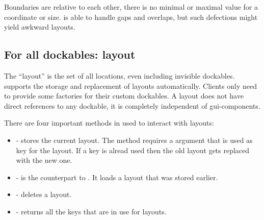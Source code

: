 Boundaries are relative to each other, there is no minimal or maximal value for a coordinate or size.  is able to handle gaps and overlaps, but such defections might yield awkward layouts.




\subsection{For all dockables: layout} \label{sec:layout}
The ``layout'' is the set of all locations, even including invisible dockables.  supports the storage and replacement of layouts automatically. \linebreak Clients only need to provide some factories for their custom dockables. A layout does not have direct references to any dockable, it is completely independent of gui-components.

There are four important methods in  used to interact with layouts:
\begin{itemize}
 \item {} - stores the current layout. The method requires a  argument that is used as key for the layout. If a key is alread used then the old layout gets replaced with the new one.
 \item {} - is the counterpart to . It loads a layout that was stored earlier.
 \item {} - deletes a layout.
 \item {} - returns all the keys that are in use for layouts.
\end{itemize}


